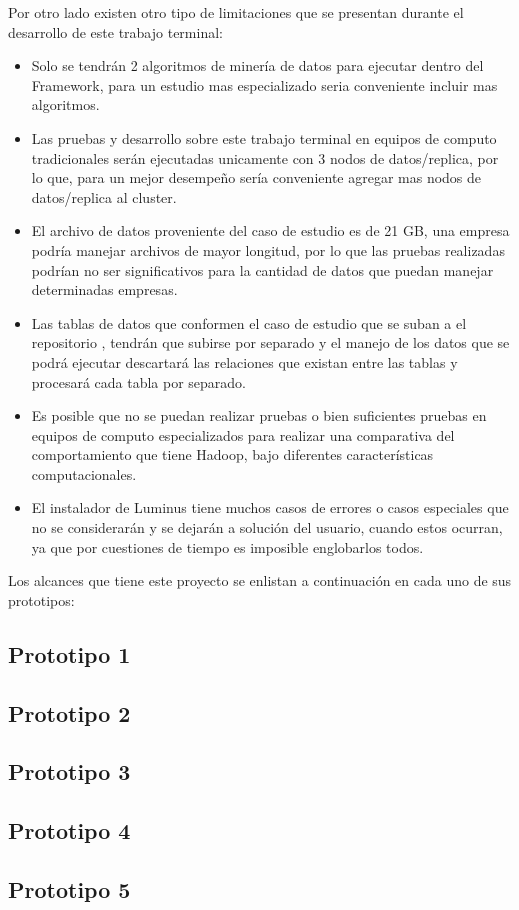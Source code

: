 Por otro lado existen otro tipo de limitaciones que se presentan durante el desarrollo de este trabajo terminal:
\begin{itemize}
	\item Solo se tendrán 2 algoritmos de minería de datos para ejecutar dentro del Framework, para un estudio mas especializado seria conveniente incluir mas algoritmos.
	\item Las pruebas y desarrollo sobre este trabajo terminal en equipos de computo tradicionales serán ejecutadas unicamente con 3 nodos de datos/replica, por lo que, para un mejor desempeño sería conveniente agregar mas nodos de datos/replica al cluster.
	\item El archivo de datos proveniente del caso de estudio es de 21 GB, una empresa podría manejar archivos de mayor longitud, por lo que las pruebas realizadas podrían no ser significativos para la cantidad de datos que puedan manejar determinadas empresas. 
	\item Las tablas de datos que conformen el caso de estudio que se suban a el repositorio , tendrán que subirse por separado y el manejo de los datos que se podrá ejecutar descartará las relaciones que existan entre las tablas y procesará cada tabla por separado.
	\item Es posible que no se puedan realizar pruebas o bien suficientes pruebas en equipos de computo especializados para realizar una comparativa del comportamiento que tiene Hadoop, bajo diferentes características computacionales.
	\item El instalador de Luminus tiene muchos casos de errores o casos especiales que no se considerarán y se dejarán a solución del usuario, cuando estos ocurran, ya que por cuestiones de tiempo es imposible englobarlos todos.
\end{itemize}

Los alcances que tiene este proyecto se enlistan a continuación en cada uno de sus prototipos:
\\
\subsection{Prototipo 1}
\subsection{Prototipo 2}
\subsection{Prototipo 3}
\subsection{Prototipo 4}
\subsection{Prototipo 5}